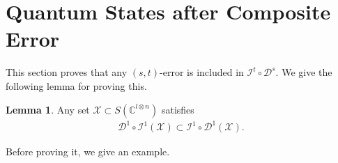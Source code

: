 \documentclass[reprint,amsmath,amssymb,aps,]{revtex4-2}
\theoremstyle{definition}
\newtheorem{lem}{Lemma}
\newcommand{\SET}[1]{\mathbb{#1}}
\newcommand{\C}{\SET{C}}
\newcommand{\1}{\mbox{1}\hspace{-0.25em}\mbox{l}}%
\newcommand{\pure}[2]{\C^{#1 \otimes #2}}
\newcommand{\state}[2]{S(\pure{#1}{#2})}
\newcommand{\QU}[1]{\mathcal{#1}}
\begin{document}
\section{Quantum States after Composite Error}
\label{sec:ins_del_state}
This section
proves that any $(s,t)$-error is included in $\QU{I}^t \circ \QU{D}^s$.
We give the following lemma for proving this.

\begin{lem}
  \label{lem:1ins_1del_kai}
  Any set $\QU{X} \subset \state{l}{n}$ satisfies
  \begin{align*}
    \QU{D}^1 \circ \QU{I}^1(\QU{X})
    \subset
    \QU{I}^1 \circ \QU{D}^1(\QU{X}).
  \end{align*}
\end{lem}

Before proving it,
we give an example.
\end{document}
